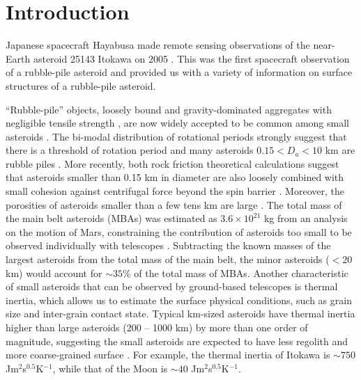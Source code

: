 \documentclass[3p,authoryear]{elsarticle}
\begin{document}
\tableofcontents
\linenumbers

\section{Introduction}\label{sec:intro}

Japanese spacecraft Hayabusa made remote sensing observations of the near-Earth asteroid 25143 Itokawa on 2005 \citep{fujiwara2006, saito2006}. 
This was the first spacecraft observation of a rubble-pile asteroid and provided us with a variety of information on surface structures of a rubble-pile asteroid.

``Rubble-pile'' objects,  loosely bound and gravity-dominated aggregates with negligible tensile strength \citep[e.g.][]{fujiwara1980}, are now
widely accepted to be common among small asteroids \citep[e.g.][]{richardson2002}. The bi-modal distribution of rotational periods strongly suggest
that there is a threshold of rotation period and many asteroids $0.15<D_a<10$ km are rubble piles \citep{pravec2002}. More recently, both rock
friction theoretical calculations suggest that asteroids smaller than 0.15 km in diameter are also loosely combined with small cohesion against
centrifugal force beyond the spin barrier \citep[e.g.][]{holsapple2007,scheeres2010,rozitis2014}. Moreover, the porosities of asteroids smaller
than a few tens km are large \citep{britt2002}. The total mass of the main belt asteroids (MBAs) was estimated as $3.6\times 10^{21}$ kg from an
analysis on the motion of Mars, constraining the contribution of asteroids too small to be observed individually with telescopes \citep{krasinsky2002}.
Subtracting the known masses of the largest asteroids \citep{demeo2014} from the total mass of the main belt, the minor asteroids ($<$20 km) would account for $\sim 35 \%$ of the total mass of MBAs. Another characteristic of small asteroids that can be observed by ground-based telescopes is thermal
inertia, which allows us to estimate the surface physical conditions, such as grain size and inter-grain contact state. Typical km-sized asteroids
have thermal inertia higher than large asteroids (200 -- 1000 km) by more than one order of magnitude, suggesting the small asteroids are
expected to have less regolith and more coarse-grained surface \citep{delbo2009}. For example, the thermal inertia of Itokawa is $\sim 750$ Jm$^2$s$^{0.5}$K$^{-1}$\citep{muller2005}, while that of the Moon is $\sim 40$ Jm$^2$s$^{0.5}$K$^{-1}$\citep{Keihm1984}.
\end{document}
